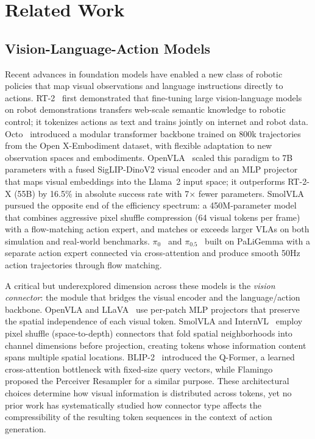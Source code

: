 \section{Related Work}
\label{sec:related_work}

\subsection{Vision-Language-Action Models}

Recent advances in foundation models have enabled a new class of robotic policies that map visual observations and language instructions directly to actions. RT-2~\cite{brohan2023rt2} first demonstrated that fine-tuning large vision-language models on robot demonstrations transfers web-scale semantic knowledge to robotic control; it tokenizes actions as text and trains jointly on internet and robot data. Octo~\cite{ghosh2024octo} introduced a modular transformer backbone trained on 800k trajectories from the Open X-Embodiment dataset, with flexible adaptation to new observation spaces and embodiments. OpenVLA~\cite{kim2024openvla} scaled this paradigm to 7B parameters with a fused SigLIP-DinoV2 visual encoder and an MLP projector that maps visual embeddings into the Llama~2 input space; it outperforms RT-2-X (55B) by 16.5\% in absolute success rate with 7$\times$ fewer parameters. SmolVLA~\cite{shukor2025smolvla} pursued the opposite end of the efficiency spectrum: a 450M-parameter model that combines aggressive pixel shuffle compression (64 visual tokens per frame) with a flow-matching action expert, and matches or exceeds larger VLAs on both simulation and real-world benchmarks. $\pi_0$~\cite{black2024pi0} and $\pi_{0.5}$~\cite{physicalintelligence2025pi05} built on PaLiGemma with a separate action expert connected via cross-attention and produce smooth 50Hz action trajectories through flow matching.

A critical but underexplored dimension across these models is the \emph{vision connector}: the module that bridges the visual encoder and the language/action backbone. OpenVLA and LLaVA~\cite{liu2023llava} use per-patch MLP projectors that preserve the spatial independence of each visual token. SmolVLA and InternVL~\cite{chen2024internvl} employ pixel shuffle (space-to-depth) connectors that fold spatial neighborhoods into channel dimensions before projection, creating tokens whose information content spans multiple spatial locations. BLIP-2~\cite{li2023blip2} introduced the Q-Former, a learned cross-attention bottleneck with fixed-size query vectors, while Flamingo~\cite{alayrac2022flamingo} proposed the Perceiver Resampler for a similar purpose. These architectural choices determine how visual information is distributed across tokens, yet no prior work has systematically studied how connector type affects the compressibility of the resulting token sequences in the context of action generation.

